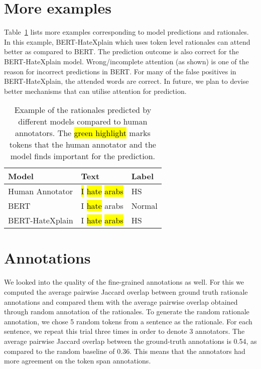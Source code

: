 \documentclass[letterpaper]{article} \usepackage{aaai21}  \usepackage{times}  \usepackage{helvet} \usepackage{courier}  \usepackage[hyphens]{url}  \usepackage{graphicx} \urlstyle{rm} \def\UrlFont{\rm}  \usepackage{natbib}  \usepackage{caption}
\newcommand{\hlg}[2][green]{{\sethlcolor{#1}\hl{#2}}}
\begin{document}
\section{More examples}
Table~\ref{tab:more_examples} lists more examples corresponding to model predictions and rationales. In this example, BERT-HateXplain which uses token level rationales can attend better as compared to BERT. The prediction outcome is also correct for the BERT-HateXplain model. Wrong/incomplete attention (as shown) is one of the reason for incorrect predictions in BERT. For many of the false positives in BERT-HateXplain, the attended words are correct. In future, we plan to devise better mechanisms that can utilise attention for prediction.

\begin{table}[t]
\centering
\begin{tabular}{lll}
\toprule
Model & Text & Label \\
\midrule
Human Annotator & \hlg{I} \hlg{hate} \hlg{arabs} & HS \\ \midrule
BERT & I \hlg{hate} arabs & Normal \\
BERT-HateXplain & I \hlg{hate} \hlg{arabs} & HS \\ \midrule
\bottomrule
\end{tabular}
\caption{Example of the rationales predicted by different models compared to human annotators. The \hlg{green highlight} marks tokens that the human annotator and the model finds important for the prediction.}
\label{tab:more_examples}
\end{table}

\section{Annotations}
We looked into the quality of the fine-grained annotations as well. For this we computed the average pairwise Jaccard overlap between ground truth rationale annotations and compared them with the average pairwise overlap obtained through random annotation of the rationales. To generate the random rationale annotation, we chose 5 random tokens from a sentence as the rationale. For each sentence, we repeat this trial three times in order to denote 3 annotators. The average pairwise Jaccard overlap between the ground-truth annotations is 0.54, as compared to the random baseline of 0.36. This means that the annotators had more agreement on the token span annotations.
\end{document}
